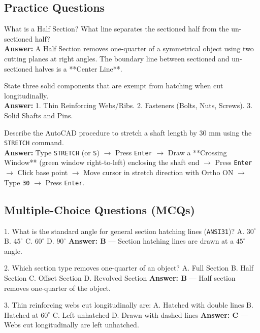 \subsection{Practice Questions}

\begin{vivaqa}
What is a Half Section? What line separates the sectioned half from the un-sectioned half?\\[4pt]
\textbf{Answer:} A Half Section removes one-quarter of a symmetrical object using two cutting planes at right angles. The boundary line between sectioned and un-sectioned halves is a **Center Line**.
\end{vivaqa}

\begin{vivaqa}
State three solid components that are exempt from hatching when cut longitudinally.\\[4pt]
\textbf{Answer:} 1. Thin Reinforcing Webs/Ribs. 2. Fasteners (Bolts, Nuts, Screws). 3. Solid Shafts and Pins.
\end{vivaqa}

\begin{vivaqa}
Describe the AutoCAD procedure to stretch a shaft length by $30\text{ mm}$ using the \texttt{STRETCH} command.\\[4pt]
\textbf{Answer:} Type \texttt{STRETCH} (or \texttt{S}) $\to$ Press \texttt{Enter} $\to$ Draw a **Crossing Window** (green window right-to-left) enclosing the shaft end $\to$ Press \texttt{Enter} $\to$ Click base point $\to$ Move cursor in stretch direction with Ortho ON $\to$ Type \texttt{30} $\to$ Press \texttt{Enter}.
\end{vivaqa}

\subsection{Multiple-Choice Questions (MCQs)}

1. What is the standard angle for general section hatching lines (\texttt{ANSI31})?  
   A. $30^\circ$  
   B. $45^\circ$  
   C. $60^\circ$  
   D. $90^\circ$  
   \textbf{Answer: B} — Section hatching lines are drawn at a $45^\circ$ angle.

2. Which section type removes one-quarter of an object?  
   A. Full Section  
   B. Half Section  
   C. Offset Section  
   D. Revolved Section  
   \textbf{Answer: B} — Half section removes one-quarter of the object.

3. Thin reinforcing webs cut longitudinally are:  
   A. Hatched with double lines  
   B. Hatched at $60^\circ$  
   C. Left unhatched  
   D. Drawn with dashed lines  
   \textbf{Answer: C} — Webs cut longitudinally are left unhatched.

